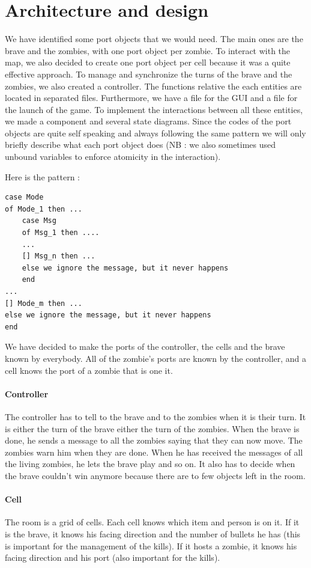 \documentclass[11pt,a4paper]{article}
\begin{document}
\section{Architecture and design}

We have identified some port objects that we would need. The main ones are the brave and the zombies, with one port object per zombie. To interact with the map, we also decided to create one port object per cell because it was a quite effective approach. To manage and synchronize the turns of the brave and the zombies, we also created a controller. The functions relative the each entities are located in separated files. Furthermore, we have a file for the GUI and a file for the launch of the game. To implement the interactions between all these entities, we made a component and several state diagrams. Since the codes of the port objects are quite self speaking and always following the same pattern  we will only briefly describe what each port object does (NB : we also sometimes used unbound variables to enforce atomicity in the interaction).

Here is the pattern :
\begin{lstlisting}[basicstyle=\ttfamily\footnotesize]
case Mode
of Mode_1 then ...
	case Msg
	of Msg_1 then ....
	...
	[] Msg_n then ...
	else we ignore the message, but it never happens
	end
...	
[] Mode_m then ...
else we ignore the message, but it never happens
end
\end{lstlisting}
 
	
We have decided to make the ports of the controller, the cells and the brave known by everybody. All of the zombie's ports are known by the controller, and a cell knows the port of a zombie that is one it.

\paragraph{Controller}
The controller has to tell to the brave and to the zombies when it is their turn. It is either the turn of the brave either the turn of the zombies. When the brave is done, he sends a message to all the zombies saying that they can now move. The zombies warn him when they are done. When he has received the messages of all the living zombies, he lets the brave play and so on. It also has to decide when the brave couldn't win anymore because there are to few objects left in the room. 

\paragraph{Cell}
The room is a grid of cells. Each cell knows which item and person is on it. If it is the brave, it knows his facing direction and the number of bullets he has (this is important for the management of the kills). If it hosts a zombie, it knows his facing direction and his port (also important for the kills).
\end{document}
